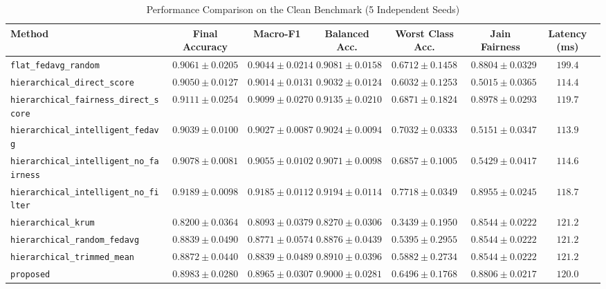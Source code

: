 \begin{table}[t]
\caption{Performance Comparison on the Clean Benchmark (5 Independent Seeds)}
\label{tab:results_clean}
\centering
\small
\begin{tabular}{lcccccc}
\toprule
\textbf{Method} & \textbf{Final Accuracy} & \textbf{Macro-F1} & \textbf{Balanced Acc.} & \textbf{Worst Class Acc.} & \textbf{Jain Fairness} & \textbf{Latency (ms)} \\
\midrule
\texttt{flat\_fedavg\_random} & $0.9061 \pm 0.0205$ & $0.9044 \pm 0.0214$ & $0.9081 \pm 0.0158$ & $0.6712 \pm 0.1458$ & $0.8804 \pm 0.0329$ & $199.4$ \\
\texttt{hierarchical\_direct\_score} & $0.9050 \pm 0.0127$ & $0.9014 \pm 0.0131$ & $0.9032 \pm 0.0124$ & $0.6032 \pm 0.1253$ & $0.5015 \pm 0.0365$ & $114.4$ \\
\texttt{hierarchical\_fairness\_direct\_score} & $0.9111 \pm 0.0254$ & $0.9099 \pm 0.0270$ & $0.9135 \pm 0.0210$ & $0.6871 \pm 0.1824$ & $0.8978 \pm 0.0293$ & $119.7$ \\
\texttt{hierarchical\_intelligent\_fedavg} & $0.9039 \pm 0.0100$ & $0.9027 \pm 0.0087$ & $0.9024 \pm 0.0094$ & $0.7032 \pm 0.0333$ & $0.5151 \pm 0.0347$ & $113.9$ \\
\texttt{hierarchical\_intelligent\_no\_fairness} & $0.9078 \pm 0.0081$ & $0.9055 \pm 0.0102$ & $0.9071 \pm 0.0098$ & $0.6857 \pm 0.1005$ & $0.5429 \pm 0.0417$ & $114.6$ \\
\texttt{hierarchical\_intelligent\_no\_filter} & $0.9189 \pm 0.0098$ & $0.9185 \pm 0.0112$ & $0.9194 \pm 0.0114$ & $0.7718 \pm 0.0349$ & $0.8955 \pm 0.0245$ & $118.7$ \\
\texttt{hierarchical\_krum} & $0.8200 \pm 0.0364$ & $0.8093 \pm 0.0379$ & $0.8270 \pm 0.0306$ & $0.3439 \pm 0.1950$ & $0.8544 \pm 0.0222$ & $121.2$ \\
\texttt{hierarchical\_random\_fedavg} & $0.8839 \pm 0.0490$ & $0.8771 \pm 0.0574$ & $0.8876 \pm 0.0439$ & $0.5395 \pm 0.2955$ & $0.8544 \pm 0.0222$ & $121.2$ \\
\texttt{hierarchical\_trimmed\_mean} & $0.8872 \pm 0.0440$ & $0.8839 \pm 0.0489$ & $0.8910 \pm 0.0396$ & $0.5882 \pm 0.2734$ & $0.8544 \pm 0.0222$ & $121.2$ \\
\texttt{proposed} & $0.8983 \pm 0.0280$ & $0.8965 \pm 0.0307$ & $0.9000 \pm 0.0281$ & $0.6496 \pm 0.1768$ & $0.8806 \pm 0.0217$ & $120.0$ \\
\bottomrule
\end{tabular}
\end{table}
